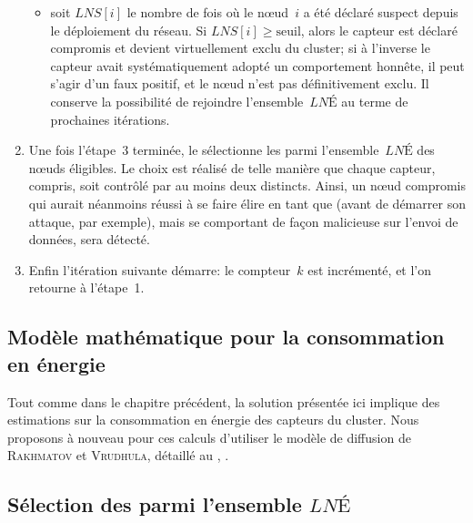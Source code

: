 \begin{enumerate}
\begin{itemize}
            \item soit $\mathit{LNS}[i]$ le nombre de fois où le nœud~$i$ a été déclaré suspect depuis le déploiement du réseau. Si $\mathit{LNS}[i] \ge \mathrm{seuil}$, alors le capteur est déclaré compromis et devient virtuellement exclu du cluster; si à l'inverse le capteur avait systématiquement adopté un comportement honnête, il peut s'agir d'un faux positif, et le nœud n'est pas définitivement exclu. Il conserve la possibilité de rejoindre l'ensemble~$\mathit{LNÉ}$ au terme de prochaines itérations.
        \end{itemize}
    \item Une fois l'étape~3 terminée, le \CH sélectionne les \cns parmi l'ensemble~$\mathit{LNÉ}$ des nœuds éligibles. Le choix est réalisé de telle manière que chaque capteur, \cns compris, soit contrôlé par au moins deux \cns distincts. Ainsi, un nœud compromis qui aurait néanmoins réussi à se faire élire en tant que \cn (avant de démarrer son attaque, par exemple), mais se comportant de façon malicieuse sur l'envoi de données, sera détecté.
    \item Enfin l'itération suivante démarre: le compteur~$k$ est incrémenté, et l'on retourne à l'étape~1.
\end{enumerate}


    \subsection{Modèle mathématique pour la consommation en énergie}

Tout comme dans le chapitre précédent, la solution présentée ici implique des estimations sur la consommation en énergie des capteurs du cluster.
Nous proposons à nouveau pour ces calculs d'utiliser le modèle de diffusion de \textsc{Rakhmatov} et \textsc{Vrudhula}, détaillé au , .

    \subsection{Sélection des \cns parmi l'ensemble $\mathit{LNÉ}$}

